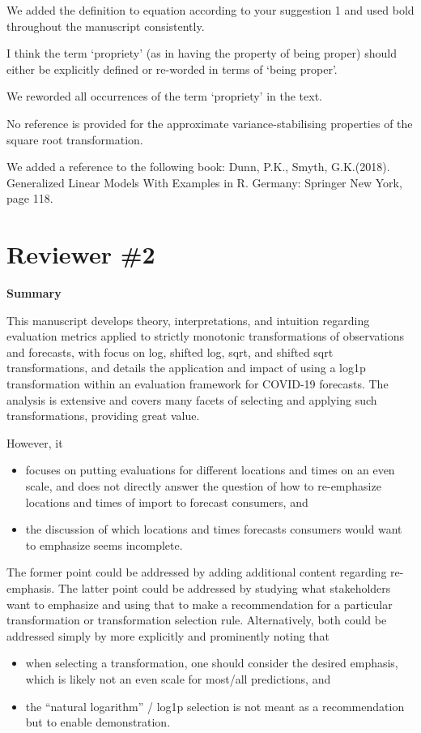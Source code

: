 \documentclass{article}
\newcommand{\black}{\color{black}}
\newcommand{\blue}{\color{blue}}
\begin{document}
\black
We added the definition to equation according to your suggestion 1 and used bold throughout the manuscript consistently. 

\blue
I think the term ‘propriety’ (as in having the property of being proper) should either be explicitly defined or re-worded in terms of ‘being proper’.

\black
We reworded all occurrences of the term `propriety' in the text. 

\blue
No reference is provided for the approximate variance-stabilising properties of the square root transformation.

\black
We added a reference to the following book:
Dunn, P.K., Smyth, G.K.(2018). Generalized Linear Models With Examples in R. Germany: Springer New York, page 118. 





\blue
\section{Reviewer \#2}

\textbf{Summary}

This manuscript develops theory, interpretations, and intuition regarding evaluation metrics applied to strictly monotonic transformations of observations and forecasts, with focus on log, shifted log, sqrt, and shifted sqrt transformations, and details the application and impact of using a log1p transformation within an evaluation framework for COVID-19 forecasts.
The analysis is extensive and covers many facets of selecting and applying such transformations, providing great value. 

However, it
\begin{itemize}
    \item focuses on putting evaluations for different locations and times on an even scale, and does not directly answer the question of how to re-emphasize locations and times of import to forecast consumers, and
    \item the discussion of which locations and times forecasts consumers would want to emphasize seems incomplete.
\end{itemize}
The former point could be addressed by adding additional content regarding re-emphasis. The latter point could be addressed by studying what stakeholders want to emphasize and using that to make a recommendation for a particular transformation or transformation selection rule. Alternatively, both could be addressed simply by more explicitly and prominently noting that
\begin{itemize}
    \item when selecting a transformation, one should consider the desired emphasis, which is likely not an even scale for most/all predictions, and
    \item the “natural logarithm” / log1p selection is not meant as a recommendation but to enable demonstration.
\end{itemize}
\end{document}
